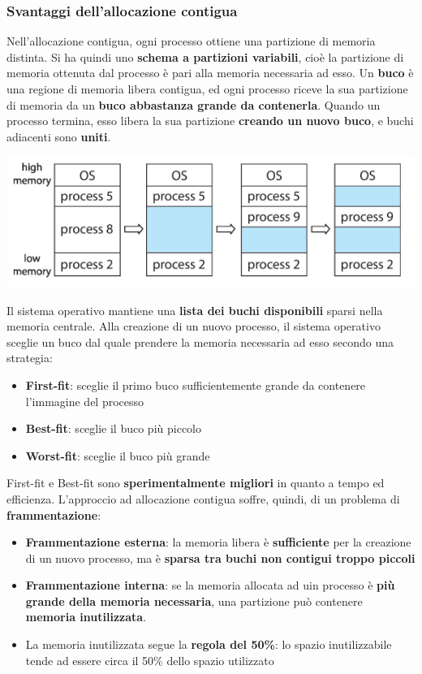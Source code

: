 \documentclass[12pt]{article}
\begin{document}
\subsubsection{Svantaggi dell'allocazione contigua}
Nell'allocazione contigua, ogni processo ottiene una partizione di memoria distinta.
Si ha quindi uno \textbf{schema a partizioni variabili}, cioè la partizione di memoria ottenuta dal processo è pari alla memoria necessaria ad esso.
Un \textbf{buco} è una regione di memoria libera contigua, ed ogni processo riceve la sua partizione di memoria da un \textbf{buco abbastanza grande da contenerla}.
Quando un processo termina, esso libera la sua partizione \textbf{creando un nuovo buco}, e buchi adiacenti sono \textbf{uniti}.
\begin{center}
    \includegraphics[width = 0.70\linewidth]{Images/58.png}
\end{center}
Il sistema operativo mantiene una \textbf{lista dei buchi disponibili} sparsi nella memoria centrale.
Alla creazione di un nuovo processo, il sistema operativo sceglie un buco dal quale prendere la memoria necessaria ad esso secondo una strategia:
\begin{itemize}
    \item \textbf{First-fit}: sceglie il primo buco sufficientemente grande da contenere l'immagine del processo
    \item \textbf{Best-fit}: sceglie il buco più piccolo
    \item \textbf{Worst-fit}: sceglie il buco più grande
\end{itemize}
First-fit e Best-fit sono \textbf{sperimentalmente migliori} in quanto a tempo ed efficienza.
L'approccio ad allocazione contigua soffre, quindi, di un problema di \textbf{frammentazione}:
\begin{itemize}
    \item \textbf{Frammentazione esterna}: la memoria libera è \textbf{sufficiente} per la creazione di un nuovo processo, ma è \textbf{sparsa tra buchi non contigui troppo piccoli}
    \item \textbf{Frammentazione interna}: se la memoria allocata ad uin processo è \textbf{più grande della memoria necessaria}, una partizione può contenere \textbf{memoria inutilizzata}.
    \item La memoria inutilizzata segue la \textbf{regola del 50\%}: lo spazio inutilizzabile tende ad essere circa il 50\% dello spazio utilizzato
\end{itemize}
\end{document}
